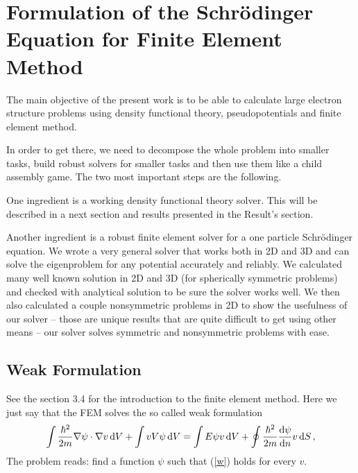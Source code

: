 \section{Formulation of the Schr\"odinger Equation for Finite Element Method}

The main objective of the present work is to be able to calculate large
electron structure problems using density functional theory, pseudopotentials
and finite element method.

In order to get there, we need to decompose the whole problem into smaller
tasks, build robust solvers for smaller tasks and then use them like a child
assembly game. The two most important steps are the following.

One ingredient is a working density functional theory solver. This will be
described in a next section and results presented in the Result's section.

Another ingredient is a robust finite element solver for a one particle
Schr\"odinger equation. We wrote a very general solver that works both in 2D
and 3D and can solve the eigenproblem for any potential accurately and
reliably. We calculated many well known solution in 2D and 3D (for spherically
symmetric problems) and checked with analytical solution to be sure the solver
works well. We then also calculated a couple nonsymmetric problems in 2D to
show the usefulness of our solver -- those are unique results that are quite
difficult to get using other means -- our solver solves symmetric and
nonsymmetric problems with ease.

\subsection{Weak Formulation}

See the section 3.4 for the introduction to the finite element method. Here we
just say that the FEM solves the so called weak formulation
\begin{equation}
  \int{\hbar^2\over2m}\nabla\psi\cdot\nabla v\,{\rm d} V+ \int vV\psi\,{\rm d} V = \int E\psi v\,{\rm d} V + \oint{\hbar^2\over2m}{{\rm d}\psi\over{\rm d}n}v\,{\rm d} S\,,  \label{w}
\end{equation}
The problem reads: find a function $\psi$ such that (\ref{w}) holds for every $v$.

